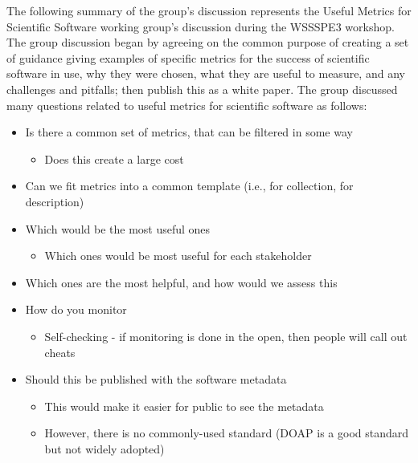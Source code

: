 The following summary of the group's discussion represents the Useful Metrics
for Scientific Software working group's discussion during the WSSSPE3 workshop.
The group discussion began by agreeing on the common purpose of creating a set
of guidance giving examples of specific metrics for the success of scientific
software in use, why they were chosen, what they are useful to measure, and any
challenges and pitfalls; then publish this as a white paper. The group discussed
many questions related to useful metrics for scientific software as follows:
\begin{itemize}

\item
Is there a common set of metrics, that can be filtered in some way

\begin{itemize}
\item
        Does this create a large cost
\end{itemize}

\item
Can we fit metrics into a common template (i.e., for collection, for description)

\item
Which would be the most useful ones

\begin{itemize}
\item
        Which ones would be most useful for each stakeholder
\end{itemize}

\item
Which ones are the most helpful, and how would we assess this

\item
How do you monitor

\begin{itemize}
\item
        Self-checking - if monitoring is done in the open, then people will call out cheats
\end{itemize}

\item
Should this be published with the software metadata

\begin{itemize}
\item
        This would make it easier for public to see the metadata

\item
However, there is no commonly-used standard (DOAP is a good standard but not
widely adopted)


\end{itemize}
\end{itemize}
